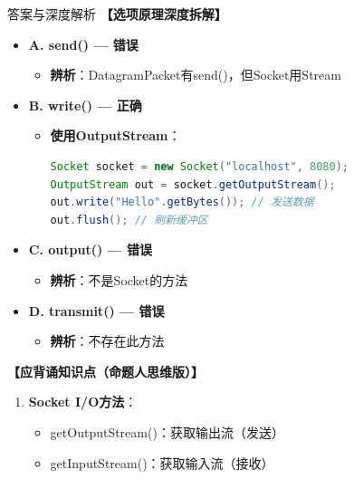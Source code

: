 \documentclass[12pt, a4paper]{ctexart}
\begin{document}
\begin{enumerate}[label=\textbf{\arabic*.}]
\begin{bluebox}{答案与深度解析}
		      \textbf{【选项原理深度拆解】}
					  \begin{itemize}[label={}, leftmargin=*, nosep]

		      \item \textbf{A. send() — 错误}
		      \begin{itemize}[label={}, leftmargin=*, nosep]
			      \item \textbf{辨析}：DatagramPacket有send()，但Socket用Stream
		      \end{itemize}

		      \item \textbf{B. write() — 正确}
		      \begin{itemize}[label={}, leftmargin=*, nosep]
			      \item \textbf{使用OutputStream}：
			            \begin{lstlisting}[language=Java]
Socket socket = new Socket("localhost", 8080);
OutputStream out = socket.getOutputStream();
out.write("Hello".getBytes()); // 发送数据
out.flush(); // 刷新缓冲区
      \end{lstlisting}
		      \end{itemize}

		      \item \textbf{C. output() — 错误}
		      \begin{itemize}[label={}, leftmargin=*, nosep]
			      \item \textbf{辨析}：不是Socket的方法
		      \end{itemize}

		      \item \textbf{D. transmit() — 错误}
		      \begin{itemize}[label={}, leftmargin=*, nosep]
			      \item \textbf{辨析}：不存在此方法
		      \end{itemize}

		      \end{itemize}

		      \textbf{【应背诵知识点（命题人思维版）】}
		      \begin{enumerate}[leftmargin=*, nosep]
			      \item \textbf{Socket I/O方法}：
			            \begin{itemize}[label={}, nosep]
				            \item getOutputStream()：获取输出流（发送）
				            \item getInputStream()：获取输入流（接收）
			            \end{itemize}


\end{enumerate}
\end{bluebox}
\end{enumerate}
\end{document}
